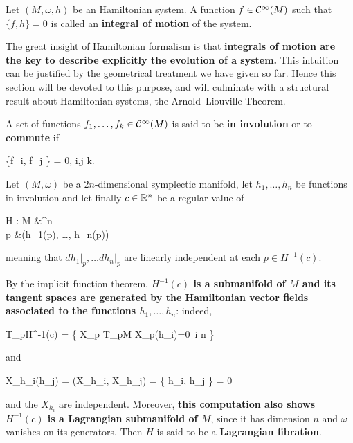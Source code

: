 \documentclass[main.tex]{subfiles}
\begin{document}
\begin{definition}
	Let $(M, \omega, h)$ be an Hamiltonian system. A function $f \in \mathcal{C}^\infty(M)$ such that $\{f,h\} = 0$ is called an \textbf{integral of motion} of the system.
\end{definition}

The great insight of Hamiltonian formalism is that \textbf{integrals of motion are the key to describe explicitly the evolution of a system.} This intuition can be justified by the geometrical treatment we have given so far. Hence this section will be devoted to this purpose, and will culminate with a structural result about Hamiltonian systems, the Arnold--Liouville Theorem.

\begin{definition}
	A set of functions $f_1, \ldots, f_k \in \mathcal{C}^\infty(M)$ is said to be \textbf{in involution} or to \textbf{commute} if
	\begin{eqalign}
		\{f_i, f_j \} = 0, \quad \forall i,j \leq k.
	\end{eqalign}
\end{definition}

\begin{construction}
\label{const:level_submanifolds_of_involutions}
	Let $(M, \omega)$ be a $2n$-dimensional symplectic manifold, let $h_1, \ldots, h_n$ be functions in involution and let finally $c \in \mathbb{R}^n$ be a regular value of
	\begin{eqalign}
		H : M &\longto \R^n\\
		p &\longmapsto (h_1(p), \ldots, h_n(p))
	\end{eqalign}
	meaning that $dh_1\vert_p, \ldots dh_n \vert_p$ are linearly independent at each $p \in H^{-1}(c)$.

	By the implicit function theorem, \textbf{$H^{-1}(c)$ is a submanifold of $M$ and its tangent spaces are generated by the Hamiltonian vector fields associated to the functions $h_1, \ldots, h_n$}: indeed,
	\begin{eqalign}
		T_pH^{-1}(c) = \{ X_p \in T_pM \suchthat X_p(h_i)=0\ \forall i \leq n \}
	\end{eqalign}
	and
	\begin{eqalign}
		X_{h_i}(h_j) = \omega(X_{h_i}, X_{h_j}) = \{ h_i, h_j \} = 0
	\end{eqalign}
	and the $X_{h_i}$ are independent. Moreover, \textbf{this computation also shows $H^{-1}(c)$ is a Lagrangian submanifold of $M$}, since it has dimension $n$ and $\omega$ vanishes on its generators. Then $H$ is said to be a \textbf{Lagrangian fibration}.
\end{construction}
\end{document}
